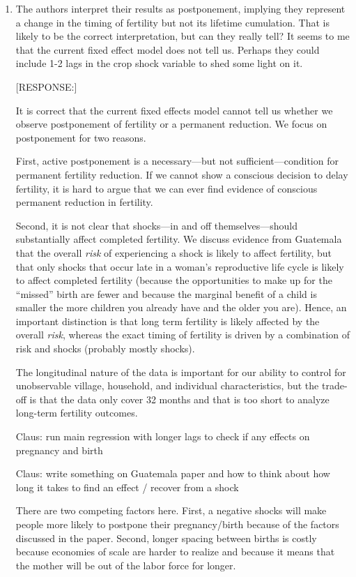 \documentclass[letterpaper,12pt]{article}
\begin{document}
\begin{enumerate}

\item The authors interpret their results as postponement, implying they
represent a change in the timing of fertility but not its lifetime
cumulation. That is likely to be the correct interpretation, but can
they really tell? It seems to me that the current fixed effect model
does not tell us. Perhaps they could include 1-2 lags in the crop shock
variable to shed some light on it.

[RESPONSE:]

It is correct that the current fixed effects model cannot tell
us whether we observe postponement of fertility or a permanent
reduction.
We focus on postponement for two reasons.

First, active postponement is a necessary---but not sufficient---condition
for permanent fertility reduction.
If we cannot show a conscious decision to delay fertility, it is 
hard to argue that we can ever find evidence of conscious permanent 
reduction in fertility.

Second, it is not clear that shocks---in and off themselves---should
substantially affect completed fertility. 
We discuss evidence from Guatemala that the overall \emph{risk} of 
experiencing a shock is likely to affect fertility, but that only
shocks that occur late in a woman's reproductive life cycle is
likely to affect completed fertility (because the opportunities to
make up for the ``missed'' birth are fewer and because the marginal
benefit of a child is smaller the more children you already have and
the older you are).
Hence, an important distinction is that long term fertility is likely
affected by the overall \emph{risk}, whereas the exact timing of
fertility is driven by a combination of risk and shocks (probably
mostly shocks).

The longitudinal nature of the data is important for our ability
to control for unobservable village, household, and individual 
characteristics, but the trade-off is that the data only cover 
32 months and that is too short to analyze long-term fertility
outcomes.
 


Claus: run main regression with longer lags to check if any effects
on pregnancy and birth 

Claus: write something on Guatemala paper and how to think about how
long it takes to find an effect / recover from a shock


There are two competing factors here.
First, a negative shocks will make people more likely to postpone 
their pregnancy/birth because of the factors discussed in the
paper.
Second, longer spacing between births is costly because economies
of scale are harder to realize and because it means that the mother
will be out of the labor force for longer.


\end{enumerate}
\end{document}
